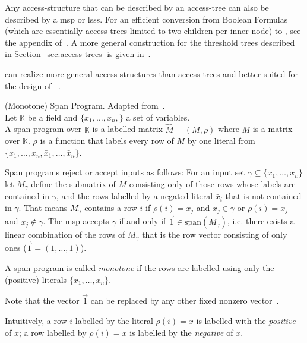Any \gls{access-structure} that can be described by an \gls{access-tree} can also be described by a \acrshort{msp} or \acrshort{lsss}.
For an efficient conversion from Boolean Formulas (which are essentially \glspl{access-tree} limited to two children per inner node) to , see the appendix of~\cite{lewko_decentralizing_2011}.
A more general construction for the threshold trees described in Section~\ref{sec:access-trees} is given in~\cite{liu_efcient_2010}.

 can realize more general access structures than \glspl{access-tree} and better suited for the design of ~\cite{agrawal_fame_2017}.

\begin{definition}
    (Monotone) Span Program. Adapted from~\cite{goyal_attribute-based_2006, beimel_secure_1996}.\\
    Let $\mathbb{K}$ be a field and $\{x_1, \dots, x_n,\}$ a set of variables.\\
    A span program over $\mathbb{K}$ is a labelled matrix $\hat{M} = (M, \rho)$ where $M$ is a matrix over $\mathbb{K}$.
    $\rho$ is a function that labels every row of $M$ by one literal from $\{x_1, \dots, x_n, \bar{x}_1, \dots, \bar{x}_n\}$.

    Span programs reject or accept inputs as follows:
    For an input set $\gamma \subseteq \{x_1, \dots, x_n\}$ let $M_\gamma$ define the submatrix of $M$ consisting only of those rows whose labels are contained in $\gamma$, and the rows labelled by a negated literal $\bar{x}_i$ that is not contained in $\gamma$.
    That means $M_\gamma$ contains a row $i$ if $\rho(i) = x_j$ and $x_j \in \gamma$ or $\rho(i) = \bar{x}_j$ and $x_j \notin \gamma$.
    The \acrshort{msp} accepts $\gamma$ if and only if $\vec{1} \in \text{span}(M_\gamma)$, i.e. there exists a linear combination of the rows of $M_\gamma$ that is the row vector consisting of only ones ($\vec{1} = (1, \dots, 1)$).

    A span program is called \emph{monotone} if the rows are labelled using only the (positive) literals $\{x_1, \dots, x_n\}$.
\end{definition}

Note that the vector $\vec{1}$ can be replaced by any other fixed nonzero vector~\cite{beimel_secure_1996}.

Intuitively, a row $i$ labelled by the literal $\rho(i) = x$ is labelled with the \emph{positive} of $x$; a row labelled by $\rho(i) = \bar{x}$ is labelled by the \emph{negative} of $x$.

